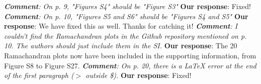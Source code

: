 \documentclass[sn-vancouver]{sn-jnl}
\begin{document}
\newline
\newline
\indent
\textit{\textbf{Comment}: On p. 9, "Figures S4" should be "Figure S3"}
\newline
\indent
\textbf{Our response}: Fixed!
\newline 
\newline 
\indent
\textit{\textbf{Comment}: On p. 10, "Figures S5 and S6" should be "Figures S4 and S5"}
\newline
\indent
{\bf Our response}: We have fixed this as well. Thanks for catching it!
\newline 
\newline
\indent
\textit{\textbf{Comment}:
I couldn't find the Ramachandran plots in the Github repository mentioned on p. 10.  The authors should just include them in the SI.}
\newline
\indent 
{\bf Our response}: The 20 Ramachandran plots now have been included in the supporting information, from Figure S8 to Figure S27.
\newline
\newline 
\indent
\textit{\textbf{Comment}:
On p. 20, there is a LaTeX error at the end of the first paragraph ($>$ outside \$).}
\newline
\indent 
{\bf Our response}: 
Fixed!
\end{document}
